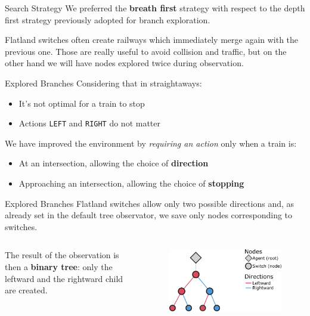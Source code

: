 \documentclass[10pt, xcolor={dvipsnames}]{beamer}
\begin{document}
\begin{frame}{Search Strategy}
    We preferred the \textbf{breath first} strategy with respect to the depth first strategy previously adopted for branch exploration.
    
    Flatland switches often create railways which immediately merge again with the previous one. Those are really useful to avoid collision and traffic, but on the other hand we will have nodes explored twice during observation. 
\end{frame}
\begin{frame}{Explored Branches}
    Considering that in \alert{straightaways}:
    \begin{itemize}
        \item It's not optimal for a train to stop
        \item Actions \texttt{LEFT} and \texttt{RIGHT} do not matter
    \end{itemize}
    We have improved the environment by \emph{requiring an action} only when a train is:
    \begin{itemize}
        \item At an intersection, allowing the choice of \textbf{direction}
        \item Approaching an intersection, allowing the choice of \textbf{stopping}
    \end{itemize}    
\end{frame}

\begin{frame}{Explored Branches}
    Flatland switches allow \alert{only two} possible directions and, as already set in the default tree observator, we save only nodes corresponding to switches. 
    
    \vspace{0.5cm}
    \begin{columns}
            The result of the observation is then a \textbf{binary tree}: only the leftward and the rightward child are created.
        
        \begin{figure}
            \centering
            \includegraphics[width=1\textwidth]{assets/environment/binaryobs.png}
        \end{figure}
            
    \end{columns}
\end{frame}
\end{document}

